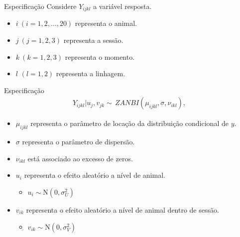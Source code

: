 \documentclass[
  ignorenonframetext,
  serif,
  professionalfont,
  usenames,
  dvipsnames,
  aspectratio = 169]{beamer}
\providecommand{\tightlist}{%
  \setlength{\itemsep}{0pt}\setlength{\parskip}{0pt}}
\renewcommand{\tightlist}{%
  \setlength{\itemsep}{0\baselineskip}
  \setlength{\parskip}{0.25\baselineskip}
}
\begin{document}
\begin{frame}{Especificação}
\protect\hypertarget{especificauxe7uxe3o}{}
Considere \(Y_{ijkl}\) a variável resposta.

\begin{itemize}
\item
  \(i\ (i=1,2,\ldots,20)\) representa o animal.
\item
  \(j\ (j=1,2,3)\) representa a sessão.
\item
  \(k\ (k=1,2,3)\) representa o momento.
\item
  \(l\) \((l=1,2)\) representa a linhagem.
\end{itemize}
\end{frame}

\begin{frame}{Especificação}
\protect\hypertarget{especificauxe7uxe3o-1}{}
\begin{equation}
    \begin{aligned}
        Y_{ijkl}|u_{j},v_{jk} \sim\,  ZANBI(\mu_{ijkl}, \sigma, \nu_{ikl}),
    \end{aligned}
    \label{eq.model.geral}
\end{equation}

\begin{itemize}
\item
  \(\mu_{ijkl}\) representa o parâmetro de locação da distribuição
  condicional de \(y\).
\item
  \(\sigma\) representa o parâmetro de dispersão.
\item
  \(\nu_{ikl}\) está associado ao excesso de zeros.
\item
  \(u_{i}\) representa o efeito aleatório a nível de animal.

  \begin{itemize}
  \tightlist
  \item
    \(u_{i} \sim \text{N}(0, \sigma^{2}_{U})\)
  \end{itemize}
\item
  \(v_{ik}\) representa o efeito aleatório a nível de animal dentro de
  sessão.

  \begin{itemize}
  \tightlist
  \item
    \(v_{ik} \sim \text{N}(0, \sigma^{2}_{V})\)
  \end{itemize}
\end{itemize}
\end{frame}
\end{document}
